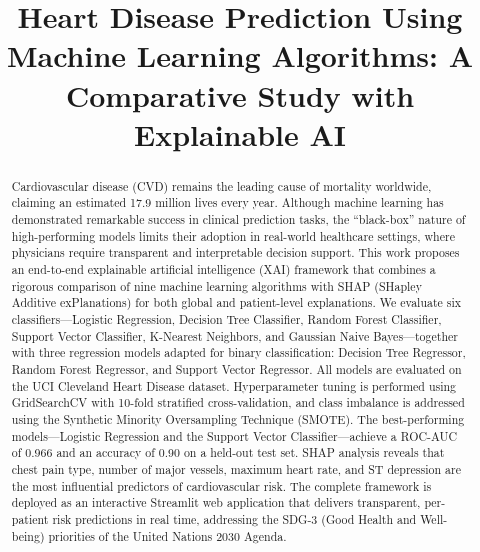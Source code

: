 \documentclass[conference]{IEEEtran}
\begin{document}
\title{Heart Disease Prediction Using Machine Learning Algorithms: A Comparative Study with Explainable AI}

\author{
}

\maketitle

\begin{abstract}
Cardiovascular disease (CVD) remains the leading cause of mortality worldwide, claiming an estimated 17.9 million lives every year. Although machine learning has demonstrated remarkable success in clinical prediction tasks, the ``black-box'' nature of high-performing models limits their adoption in real-world healthcare settings, where physicians require transparent and interpretable decision support. This work proposes an end-to-end explainable artificial intelligence (XAI) framework that combines a rigorous comparison of nine machine learning algorithms with SHAP (SHapley Additive exPlanations) for both global and patient-level explanations. We evaluate six classifiers---Logistic Regression, Decision Tree Classifier, Random Forest Classifier, Support Vector Classifier, K-Nearest Neighbors, and Gaussian Naive Bayes---together with three regression models adapted for binary classification: Decision Tree Regressor, Random Forest Regressor, and Support Vector Regressor. All models are evaluated on the UCI Cleveland Heart Disease dataset. Hyperparameter tuning is performed using GridSearchCV with 10-fold stratified cross-validation, and class imbalance is addressed using the Synthetic Minority Oversampling Technique (SMOTE). The best-performing models---Logistic Regression and the Support Vector Classifier---achieve a ROC-AUC of 0.966 and an accuracy of 0.90 on a held-out test set. SHAP analysis reveals that chest pain type, number of major vessels, maximum heart rate, and ST depression are the most influential predictors of cardiovascular risk. The complete framework is deployed as an interactive Streamlit web application that delivers transparent, per-patient risk predictions in real time, addressing the SDG-3 (Good Health and Well-being) priorities of the United Nations 2030 Agenda.
\end{abstract}
\end{document}
